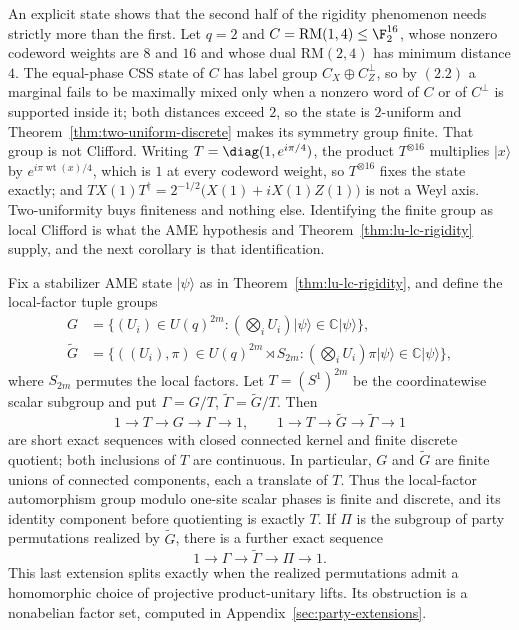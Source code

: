 \begin{remark}
\label{rem:two-uniform-not-clifford}
An explicit state shows that the second half of the rigidity phenomenon
needs strictly more than the first.  Let \(q=2\) and
\(C=\mathrm{RM}(1,4)\leq\F_2^{16}\), whose nonzero codeword weights are
\(8\) and \(16\) and whose dual \(\mathrm{RM}(2,4)\) has minimum distance
\(4\).  The equal-phase CSS state of \(C\) has label group
\(C_X\oplus C^\perp_Z\), so by \((2.2)\) a marginal fails to be maximally
mixed only when a nonzero word of \(C\) or of \(C^\perp\) is supported
inside it; both distances exceed \(2\), so the state is \(2\)-uniform and
Theorem~\ref{thm:two-uniform-discrete} makes its symmetry group finite.
That group is not Clifford.  Writing \(T=\diag(1,e^{i\pi/4})\), the product
\(T^{\otimes16}\) multiplies \(\lvert x\rangle\) by
\(e^{i\pi\operatorname{wt}(x)/4}\), which is \(1\) at every codeword
weight, so \(T^{\otimes16}\) fixes the state exactly; and
\(TX(1)T^\dagger=2^{-1/2}\bigl(X(1)+iX(1)Z(1)\bigr)\) is not a Weyl axis.
Two-uniformity buys finiteness and nothing else.  Identifying the finite
group as local Clifford is what the AME hypothesis and
Theorem~\ref{thm:lu-lc-rigidity} supply, and the next corollary is that
identification.
\end{remark}

\begin{corollary}
\label{cor:discrete-lu-symmetry}
Fix a stabilizer AME state \(\lvert\psi\rangle\) as in
Theorem~\ref{thm:lu-lc-rigidity}, and define the local-factor tuple groups
\[
\begin{split}
G&=\{(U_i)\in U(q)^{2m}:
       (\bigotimes_iU_i)\lvert\psi\rangle
          \in\mathbb C\lvert\psi\rangle\},\\
\widetilde G
 &=\{((U_i),\pi)\in U(q)^{2m}\rtimes S_{2m}:
       (\bigotimes_iU_i)\pi\lvert\psi\rangle
          \in\mathbb C\lvert\psi\rangle\},
\end{split}
\]
where \(S_{2m}\) permutes the local factors.  Let
\(T=(S^1)^{2m}\) be the coordinatewise scalar subgroup and put
\(\Gamma=G/T\), \(\widetilde\Gamma=\widetilde G/T\).  Then
\[
  1\longrightarrow T\longrightarrow G\longrightarrow \Gamma
    \longrightarrow 1,
  \qquad
  1\longrightarrow T\longrightarrow \widetilde G
    \longrightarrow \widetilde\Gamma\longrightarrow 1
\]
are short exact sequences with closed connected kernel and finite
discrete quotient; both inclusions of \(T\) are continuous.  In
particular, \(G\) and \(\widetilde G\) are finite unions of connected
components, each a translate of \(T\).  Thus the local-factor
automorphism group modulo one-site scalar phases is finite and discrete,
and its identity component before quotienting is exactly \(T\).
If \(\Pi\) is the subgroup of
party permutations realized by \(\widetilde G\), there is a further exact
sequence
\[
  1\longrightarrow \Gamma\longrightarrow\widetilde\Gamma
    \longrightarrow\Pi\longrightarrow 1.
\]
This last extension splits exactly when the realized permutations admit a
homomorphic choice of projective product-unitary lifts.  Its obstruction is
a nonabelian factor set, computed in
Appendix~\ref{sec:party-extensions}.
\end{corollary}

